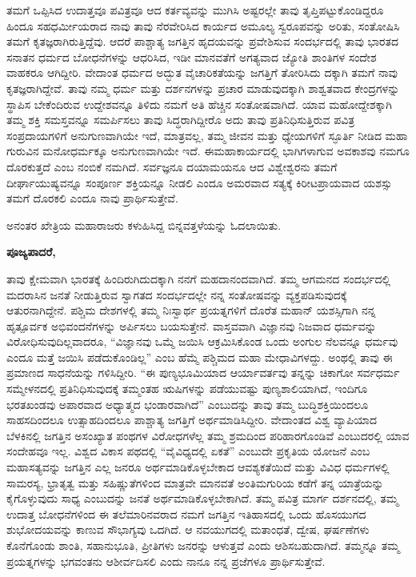 ತಮಗೆ ಒಪ್ಪಿಸಿದ ಉದಾತ್ತವೂ ಪವಿತ್ರವೂ ಆದ ಕರ್ತವ್ಯವನ್ನು ಮುಗಿಸಿ ಅಷ್ಟರಲ್ಲೇ ತಾವು ತೃಪ್ತಿಪಟ್ಟುಕೊಂಡಿದ್ದರೂ ಹಿಂದೂ ಸಹಧರ್ಮೀಯರಾದ ನಾವು ತಾವು ನೆರವೇರಿಸಿದ ಕಾರ್ಯದ ಅಮೂಲ್ಯ ಸ್ವರೂಪವನ್ನು ಅರಿತು, ಸಂತೋಷಿಸಿ ತಮಗೆ ಕೃತಜ್ಞರಾಗಿರುತ್ತಿದ್ದೆವು. ಆದರೆ ಪಾಶ್ಚಾತ್ಯ ಜಗತ್ತಿನ ಹೃದಯವನ್ನು ಪ್ರವೇಶಿಸುವ ಸಂದರ್ಭದಲ್ಲಿ ತಾವು ಭಾರತದ ಸನಾತನ ಧರ್ಮದ ಬೋಧನೆಗಳನ್ನು ಆಧರಿಸಿದ, ಇಡೀ ಮಾನವತೆಗೆ ಅಗತ್ಯವಾದ ಜ್ಯೋತಿ ಶಾಂತಿಗಳ ಸಂದೇಶ ವಾಹಕರೂ ಆಗಿದ್ದೀರಿ. ವೇದಾಂತ ಧರ್ಮದ ಅದ್ಭುತ ವೈಚಾರಿಕತೆಯನ್ನು ಜಗತ್ತಿಗೆ ತೋರಿಸಿದು ದಕ್ಕಾಗಿ ತಮಗೆ ನಾವು ಕೃತಜ್ಞರಾಗಿದ್ದೇವೆ. ತಾವು ನಮ್ಮ ಧರ್ಮ ಮತ್ತು ದರ್ಶನಗಳನ್ನು ಪ್ರಚಾರ ಮಾಡುವುದಕ್ಕಾಗಿ ಶಾಶ್ವತವಾದ ಕೇಂದ್ರಗಳನ್ನು ಸ್ಥಾಪಿಸ ಬೇಕೆಂದಿರುವ ಉದ್ದೇಶವನ್ನೂ ತಿಳಿದು ನಮಗೆ ಅತಿ ಹೆಚ್ಚಿನ ಸಂತೋಷವಾಗಿದೆ. ಯಾವ ಮಹೋದ್ದೇಶಕ್ಕಾಗಿ ತಮ್ಮ ಶಕ್ತಿ ಸಮಸ್ತವನ್ನೂ ಸಮರ್ಪಿಸಲು ತಾವು ಸಿದ್ಧರಾಗಿದ್ದೀರೊ ಅದು ತಾವು ಪ್ರತಿನಿಧಿಸುತ್ತಿರುವ ಪವಿತ್ರ ಸಂಪ್ರದಾಯಗಳಿಗೆ ಅನುಗುಣವಾಗಿಯೇ ಇದೆ, ಮಾತ್ರವಲ್ಲ, ತಮ್ಮ ಜೀವನ ಮತ್ತು ಧ್ಯೇಯಗಳಿಗೆ ಸ್ಫೂರ್ತಿ ನೀಡಿದ ಮಹಾ ಗುರುವಿನ ಮನೋಧರ್ಮಕ್ಕೂ ಅನುಗುಣವಾಗಿಯೇ ಇದೆ. ಈ\break ಮಹಾಕಾರ್ಯದಲ್ಲಿ ಭಾಗಿಗಳಾಗುವ ಅವಕಾಶವು ನಮಗೂ ದೊರಕುತ್ತದೆ ಎಂಬ ನಂಬಿಕೆ ನಮಗಿದೆ. ಸರ್ವಜ್ಞನೂ ದಯಾಮಯನೂ ಆದ ವಿಶ್ವೇಶ್ವರನು ತಮಗೆ ದೀರ್ಘಾಯುಷ್ಯವನ್ನೂ ಸಂಪೂರ್ಣ ಶಕ್ತಿಯನ್ನೂ ನೀಡಲಿ ಎಂದೂ ಅಮರವಾದ ಸತ್ಯಕ್ಕೆ ಕಿರೀಟಪ್ರಾಯವಾದ ಯಶಸ್ಸು ತಮಗೆ ದೊರಕಲಿ ಎಂದೂ ನಾವು ಪ್ರಾರ್ಥಿಸುತ್ತೇವೆ.

ಅನಂತರ ಖೇತ್ರಿಯ ಮಹಾರಾಜರು ಕಳುಹಿಸಿದ್ದ ಬಿನ್ನವತ್ತಳೆಯನ್ನು ಓದಲಾಯಿತು.

\textbf{ಪೂಜ್ಯಪಾದರೆ,}

ತಾವು ಕ್ಷೇಮವಾಗಿ ಭಾರತಕ್ಕೆ ಹಿಂದಿರುಗಿದುದಕ್ಕಾಗಿ ನನಗೆ ಮಹದಾನಂದವಾಗಿದೆ. ತಮ್ಮ ಆಗಮನದ ಸಂದರ್ಭದಲ್ಲಿ ಮದರಾಸಿನ ಜನತೆ ನೀಡುತ್ತಿರುವ ಸ್ವಾಗತದ ಸಂದರ್ಭದಲ್ಲೇ ನನ್ನ ಸಂತೋಷವನ್ನು ವ್ಯಕ್ತಪಡಿಸುವುದಕ್ಕೆ ಆತುರನಾಗಿದ್ದೇನೆ. ಪಶ್ಚಿಮ ದೇಶಗಳಲ್ಲಿ ತಮ್ಮ ನಿಃಸ್ವಾರ್ಥ ಪ್ರಯತ್ನಗಳಿಗೆ ದೊರೆತ ಮಹಾನ್​ ಯಶಸ್ಸಿಗಾಗಿ ನನ್ನ ಹೃತ್ಪೂರ್ವಕ ಅಭಿವಂದನೆಗಳನ್ನು ಅರ್ಪಿಸಲು ಬಯಸುತ್ತೇನೆ. ವಾಸ್ತವವಾಗಿ ವಿಜ್ಞಾನವು ನಿಜವಾದ ಧರ್ಮವನ್ನು ವಿರೋಧಿಸುವುದಿಲ್ಲವಾದರೂ, “ವಿಜ್ಞಾನವು ಒಮ್ಮೆ ಜಯಿಸಿ ಆಕ್ರಮಿಸಿಕೊಂಡ ಒಂದು ಅಂಗುಲ ನೆಲವನ್ನೂ ಧರ್ಮವು ಎಂದೂ ಮತ್ತೆ ಜಯಿಸಿ ಪಡೆದುಕೊಂಡಿಲ್ಲ” ಎಂಬ ಹೆಮ್ಮೆ ಪಶ್ಚಿಮದ ಮಹಾ ಮೇಧಾವಿಗಳದ್ದು. ಅಂಥಲ್ಲಿ ತಾವು ಈ ಪ್ರಮಾಣದ ಸಾಧನೆಯನ್ನು ಗಳಿಸಿದ್ದೀರಿ. “ಈ ಪುಣ್ಯಭೂಮಿಯಾದ ಆರ್ಯಾವರ್ತವು ತನ್ನನ್ನು ಚಿಕಾಗೋ ಸರ್ವಧರ್ಮ ಸಮ್ಮೇಳನದಲ್ಲಿ ಪ್ರತಿನಿಧಿಸುವುದಕ್ಕೆ ತಮ್ಮಂತಹ ಋಷಿಗಳನ್ನು ಪಡೆಯುವಷ್ಟು ಪುಣ್ಯಶಾಲಿಯಾಗಿದೆ, ಇಂದಿಗೂ ಭರತಖಂಡವು ಅಪಾರವಾದ ಅಧ್ಯಾತ್ಮದ ಭಂಡಾರವಾಗಿದೆ” ಎಂಬುದನ್ನು ತಾವು ತಮ್ಮ ಬುದ್ಧಿಶಕ್ತಿಯಿಂದಲೂ ಸಾಹಸದಿಂದಲೂ ಉತ್ಸಾಹದಿಂದಲೂ ಪಾಶ್ಚಾತ್ಯ ಜಗತ್ತಿಗೆ ಅರ್ಥಮಾಡಿಸಿದ್ದೀರಿ. ವೇದಾಂತದ ವಿಶ್ವ ವ್ಯಾಪಿಯಾದ ಬೆಳಕಿನಲ್ಲಿ ಜಗತ್ತಿನ ಅಸಂಖ್ಯಾತ ಪಂಥಗಳ ವಿರೋಧಗಳೆಲ್ಲ ತಮ್ಮ ಶ್ರಮದಿಂದ ಪರಿಹಾರಗೊಂಡಿವೆ ಎಂಬುದರಲ್ಲಿ ಯಾವ ಸಂದೇಹವೂ ಇಲ್ಲ. ವಿಶ್ವದ ವಿಕಾಸ ಪಥದಲ್ಲಿ “ವೈವಿಧ್ಯದಲ್ಲಿ ಏಕತೆ” ಎಂಬುದೇ ಪ್ರಕೃತಿಯ ಯೋಜನೆ ಎಂಬ ಮಹಾಸತ್ಯವನ್ನು ಜಗತ್ತಿನ ಎಲ್ಲ ಜನರೂ ಅರ್ಥಮಾಡಿಕೊಳ್ಳಬೇಕಾದ ಆವಶ್ಯಕತೆಯಿದೆ ಮತ್ತು ವಿವಿಧ ಧರ್ಮಗಳಲ್ಲಿ ಸಾಮರಸ್ಯ, ಭ್ರಾತೃತ್ವ ಮತ್ತು ಸಹಿಷ್ಣುತೆಗಳಿಂದ ಮಾತ್ರವೇ ಮಾನವತೆ ಅಂತಿಮಗುರಿಯ ಕಡೆಗೆ ತನ್ನ ಯಾತ್ರೆಯನ್ನು ಕೈಗೊಳ್ಳುವುದು ಸಾಧ್ಯ ಎಂಬುದನ್ನು ಜನತೆ ಅರ್ಥಮಾಡಿಕೊಳ್ಳಬೇಕಾಗಿದೆ. ತಮ್ಮ ಪವಿತ್ರ ಮಾರ್ಗ ದರ್ಶನದಲ್ಲಿ, ತಮ್ಮ ಉದಾತ್ತ ಬೋಧನೆಗಳಿಂದ ಈ ತಲೆಮಾರಿನವರಾದ ನಮಗೆ ಜಗತ್ತಿನ ಇತಿಹಾಸದಲ್ಲಿ ಒಂದು ಹೊಸಯುಗದ ಶುಭೋದಯವನ್ನು ಕಾಣುವ ಸೌಭಾಗ್ಯವು ಒದಗಿದೆ. ಆ ನವಯುಗದಲ್ಲಿ ಮತಾಂಧತೆ, ದ್ವೇಷ, ಘರ್ಷಣೆಗಳು ಕೊನೆಗೊಂಡು ಶಾಂತಿ, ಸಹಾನುಭೂತಿ, ಪ್ರೀತಿಗಳು ಜನರನ್ನು ಆಳುತ್ತವೆ ಎಂದು ಆಶಿಸಬಹುದಾಗಿದೆ. ತಮ್ಮನ್ನೂ ತಮ್ಮ ಪ್ರಯತ್ನಗಳನ್ನು ಭಗವಂತನು ಆಶೀರ್ವದಿಸಲಿ ಎಂದು ನಾನೂ ನನ್ನ ಪ್ರಜೆಗಳೂ ಪ್ರಾರ್ಥಿಸುತ್ತೇವೆ.

